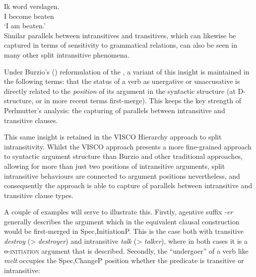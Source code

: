 \documentclass[output=paper]{langsci/langscibook}
\begin{document}
\ea {}
    \sn
    \gll Ik   word   verslagen.\\
        I   become   beaten\\
    \glt \enquote*{I am beaten.}\\
\z
Similar parallels between intransitives and transitives, which can likewise be
captured in terms of sensitivity to grammatical relations, can also be seen in
many other split intransitive phenomena.

Under Burzio’s (\citeyear{Burzio1981,Burzio1986}) reformulation of the
, a variant of this insight is maintained in the
following terms: that the status of a verb as unergative or
unaccusative is directly related to the \emph{position} of
its argument in the syntactic structure (at D-structure, or in more recent
terms first-merge). This keeps the key strength of Perlmutter’s analysis: the
capturing of parallels between intransitive and transitive clauses.

This same insight is retained in the VISCO Hierarchy approach to split
intransitivity. Whilst the VISCO approach presents a more fine-grained approach
to syntactic argument structure than Burzio and other traditional approaches,
allowing for more than just two positions of intransitive arguments, split
intransitive behaviours are connected to argument positions nevertheless, and
consequently the approach is able to capture of parallels between intransitive
and transitive clause types.

A couple of examples will serve to illustrate this. Firstly, agentive suffix
\emph{{}-er} generally describes the argument which in the equivalent clausal
construction would be first-merged in Spec,InitiationP. This is the case both
with transitive \emph{destroy} (> \emph{destroyer}) and intransitive
\emph{talk} (> \emph{talker}), where in both cases it is a
\textsc{θ-initiation} argument that is described. Secondly, the
\enquote{undergoer} of a verb like \emph{melt} occupies the Spec,ChangeP
position whether the predicate is transitive or intransitive:
\end{document}
